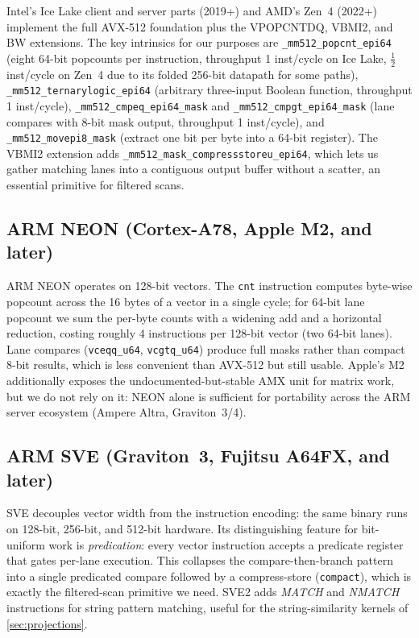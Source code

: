 \documentclass[10pt]{article}
\theoremstyle{definition}
\begin{document}
Intel's Ice Lake client and server parts (2019+) and AMD's Zen~4 (2022+) implement the full AVX-512 foundation plus the VPOPCNTDQ, VBMI2, and BW extensions. The key intrinsics for our purposes are \texttt{\_mm512\_popcnt\_epi64} (eight 64-bit popcounts per instruction, throughput 1 inst/cycle on Ice Lake, $\tfrac{1}{2}$ inst/cycle on Zen~4 due to its folded 256-bit datapath for some paths), \texttt{\_mm512\_ternarylogic\_epi64} (arbitrary three-input Boolean function, throughput 1 inst/cycle), \texttt{\_mm512\_cmpeq\_epi64\_mask} and \texttt{\_mm512\_cmpgt\_epi64\_mask} (lane compares with 8-bit mask output, throughput 1 inst/cycle), and \texttt{\_mm512\_movepi8\_mask} (extract one bit per byte into a 64-bit register). The VBMI2 extension adds \texttt{\_mm512\_mask\_compressstoreu\_epi64}, which lets us gather matching lanes into a contiguous output buffer without a scatter, an essential primitive for filtered scans.

\subsection{ARM NEON (Cortex-A78, Apple M2, and later)}

ARM NEON operates on 128-bit vectors. The \texttt{cnt} instruction computes byte-wise popcount across the 16 bytes of a vector in a single cycle; for 64-bit lane popcount we sum the per-byte counts with a widening add and a horizontal reduction, costing roughly 4 instructions per 128-bit vector (two 64-bit lanes). Lane compares (\texttt{vceqq\_u64}, \texttt{vcgtq\_u64}) produce full masks rather than compact 8-bit results, which is less convenient than AVX-512 but still usable. Apple's M2 additionally exposes the undocumented-but-stable AMX unit for matrix work, but we do not rely on it: NEON alone is sufficient for portability across the ARM server ecosystem (Ampere Altra, Graviton~3/4).

\subsection{ARM SVE (Graviton~3, Fujitsu A64FX, and later)}

SVE decouples vector width from the instruction encoding: the same binary runs on 128-bit, 256-bit, and 512-bit hardware. Its distinguishing feature for bit-uniform work is \emph{predication}: every vector instruction accepts a predicate register that gates per-lane execution. This collapses the compare-then-branch pattern into a single predicated compare followed by a compress-store (\texttt{compact}), which is exactly the filtered-scan primitive we need. SVE2 adds \emph{MATCH} and \emph{NMATCH} instructions for string pattern matching, useful for the string-similarity kernels of \cref{sec:projections}.
\end{document}
